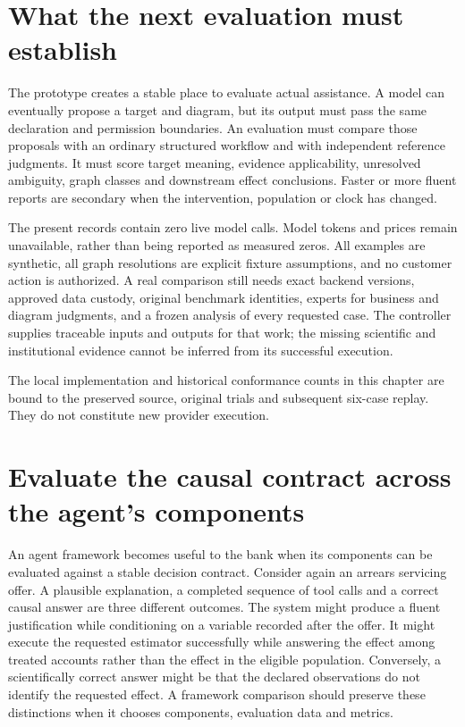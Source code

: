 \section{What the next evaluation must establish}

The prototype creates a stable place to evaluate actual assistance. A model can
eventually propose a target and diagram, but its output must pass the same
declaration and permission boundaries. An evaluation must compare those proposals
with an ordinary structured workflow and with independent reference judgments.
It must score target meaning, evidence applicability, unresolved ambiguity,
graph classes and downstream effect conclusions. Faster or more fluent reports
are secondary when the intervention, population or clock has changed.

The present records contain zero live model calls. Model tokens and prices
remain unavailable, rather than being reported as measured zeros. All examples
are synthetic, all graph resolutions are explicit fixture assumptions, and no
customer action is authorized. A real comparison still needs exact backend
versions, approved data custody, original benchmark identities, experts for
business and diagram judgments, and a frozen analysis of every requested case.
The controller supplies traceable inputs and outputs for that work; the missing
scientific and institutional evidence cannot be inferred from its successful
execution.



\par The local implementation and historical conformance counts in this chapter are bound to the preserved source, original trials and subsequent six-case replay. They do not constitute new provider execution. \citep{exec14_l6_local}
\label{exec14:l6-end}


\section{Evaluate the causal contract across the agent's components}
\label{exec18:framework-evaluation}

An agent framework becomes useful to the bank when its components can be
evaluated against a stable decision contract. Consider again an arrears
servicing offer. A plausible explanation, a completed sequence of tool calls
and a correct causal answer are three different outcomes. The system might
produce a fluent justification while conditioning on a variable recorded
after the offer. It might execute the requested estimator successfully while
answering the effect among treated accounts rather than the effect in the
eligible population. Conversely, a scientifically correct answer might be
that the declared observations do not identify the requested effect. A
framework comparison should preserve these distinctions when it chooses
components, evaluation data and metrics.

